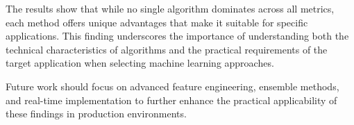 The results show that while no single algorithm dominates across all metrics, each method offers unique advantages that make it suitable for specific applications. This finding underscores the importance of understanding both the technical characteristics of algorithms and the practical requirements of the target application when selecting machine learning approaches.

Future work should focus on advanced feature engineering, ensemble methods, and real-time implementation to further enhance the practical applicability of these findings in production environments.